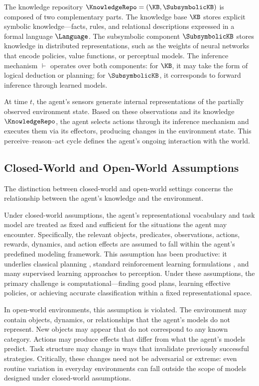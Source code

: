 The knowledge repository $\KnowledgeRepo = (\KB, \SubsymbolicKB)$ is composed of two complementary parts. The knowledge base $\KB$ stores explicit symbolic knowledge---facts, rules, and relational descriptions expressed in a formal language $\Language$. The subsymbolic component $\SubsymbolicKB$ stores knowledge in distributed representations, such as the weights of neural networks that encode policies, value functions, or perceptual models. The inference mechanism $\vdash$ operates over both components: for $\KB$, it may take the form of logical deduction or planning; for $\SubsymbolicKB$, it corresponds to forward inference through learned models.

At time $t$, the agent's sensors generate internal representations of the partially observed environment state. Based on these observations and its knowledge $\KnowledgeRepo$, the agent selects actions through its inference mechanism and executes them via its effectors, producing changes in the environment state. This perceive--reason--act cycle defines the agent's ongoing interaction with the world.

\subsection{Closed-World and Open-World Assumptions}
\label{sec:closed_open}

The distinction between closed-world and open-world settings concerns the relationship between the agent's knowledge and the environment.

Under closed-world assumptions, the agent's representational vocabulary and task model are treated as fixed and sufficient for the situations the agent may encounter. Specifically, the relevant objects, predicates, observations, actions, rewards, dynamics, and action effects are assumed to fall within the agent's predefined modeling framework. This assumption has been productive: it underlies classical planning \citep{fikes1971strips, mcdermott1998pddl}, standard reinforcement learning formulations \citep{sutton2018reinforcement}, and many supervised learning approaches to perception. Under these assumptions, the primary challenge is computational---finding good plans, learning effective policies, or achieving accurate classification within a fixed representational space.

In open-world environments, this assumption is violated. The environment may contain objects, dynamics, or relationships that the agent's models do not represent. New objects may appear that do not correspond to any known category. Actions may produce effects that differ from what the agent's models predict. Task structure may change in ways that invalidate previously successful strategies. Critically, these changes need not be adversarial or extreme: even routine variation in everyday environments can fall outside the scope of models designed under closed-world assumptions.

